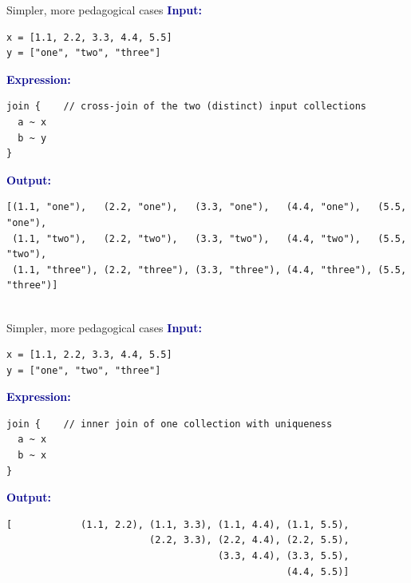 \documentclass[aspectratio=169]{beamer}
\begin{document}
\begin{frame}[fragile]{Simpler, more pedagogical cases}
\vspace{0.25 cm}
\textcolor{darkblue}{\large\bf Input:}

\begin{verbatim}
x = [1.1, 2.2, 3.3, 4.4, 5.5]
y = ["one", "two", "three"]
\end{verbatim}

\vspace{0.25 cm}
\textcolor{darkblue}{\large\bf Expression:}

\begin{verbatim}
join {    // cross-join of the two (distinct) input collections
  a ~ x
  b ~ y
}
\end{verbatim}

\vspace{0.25 cm}
\textcolor{darkblue}{\large\bf Output:}

\begin{verbatim}
[(1.1, "one"),   (2.2, "one"),   (3.3, "one"),   (4.4, "one"),   (5.5, "one"),
 (1.1, "two"),   (2.2, "two"),   (3.3, "two"),   (4.4, "two"),   (5.5, "two"),
 (1.1, "three"), (2.2, "three"), (3.3, "three"), (4.4, "three"), (5.5, "three")]


\end{verbatim}
\end{frame}

\begin{frame}[fragile]{Simpler, more pedagogical cases}
\vspace{0.25 cm}
\textcolor{darkblue}{\large\bf Input:}

\begin{verbatim}
x = [1.1, 2.2, 3.3, 4.4, 5.5]
y = ["one", "two", "three"]
\end{verbatim}

\vspace{0.25 cm}
\textcolor{darkblue}{\large\bf Expression:}

\begin{verbatim}
join {    // inner join of one collection with uniqueness
  a ~ x
  b ~ x
}
\end{verbatim}

\vspace{0.25 cm}
\textcolor{darkblue}{\large\bf Output:}

\begin{verbatim}
[            (1.1, 2.2), (1.1, 3.3), (1.1, 4.4), (1.1, 5.5),
                         (2.2, 3.3), (2.2, 4.4), (2.2, 5.5),
                                     (3.3, 4.4), (3.3, 5.5),
                                                 (4.4, 5.5)]

\end{verbatim}
\end{frame}
\end{document}
